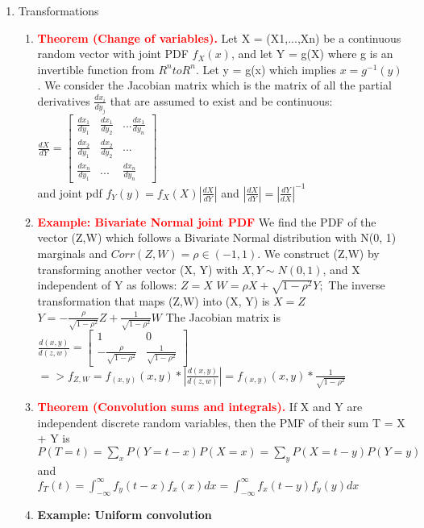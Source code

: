\documentclass[11pt]{article}
\begin{document}
\begin{enumerate}
\begin{enumerate}
\end{enumerate}
\item Transformations
\begin{enumerate}
	\item \textcolor{red}{\textbf{Theorem (Change of variables).}} Let X = (X1,...,Xn) be a continuous random vector with joint PDF $f_X(x)$,
	and let Y = g(X) where g is an invertible function from $R^n to R^n$. Let y = g(x) which implies $x = g^{-1}(y)$. We
	consider the Jacobian matrix which is the matrix of all the partial derivatives $\frac{dx_i}{dy_j}$ that are assumed to exist
	and be continuous:\\
	$\frac{dX}{dY}=\begin{bmatrix}
	\frac{dx_1}{dy_1} & \frac{dx_1}{dy_2} & ... \frac{dx_1}{dy_n}\\
	\frac{dx_2}{dy_1} & \frac{dx_2}{dy_2} & ... \\
	\frac{dx_n}{dy_1} & ... &\frac{dx_n}{dy_n}
	\end{bmatrix}$\\
	and joint pdf $f_Y(y) = f_X(X)|\frac{dX}{dY}|$ and $|\frac{dX}{dY}| = |\frac{dY}{dX}|^{-1}$ 
	\item \textcolor{red}{\textbf{Example: Bivariate Normal joint PDF}}
	We find the PDF of the vector (Z,W) which follows a Bivariate Normal distribution with N(0, 1) marginals
	and $Corr(Z,W) = \rho \in(-1, 1)$. We construct (Z,W) by transforming another vector (X, Y) with $X, Y \sim
	N(0, 1)$, and X independent of Y as follows:
	$Z = X$
	$W = \rho X + \sqrt{1-\rho^2}Y;$
	The inverse transformation that maps (Z,W) into (X, Y) is
	$X = Z$
	$Y = -\frac{\rho}{\sqrt{1-\rho^2}}Z 	+ \frac{1}{\sqrt{1-\rho^2}}W$
	The Jacobian matrix is
	$\frac{d(x,y)}{d(z,w)} = \begin{bmatrix}
		1 & 0 \\
		-\frac{\rho}{\sqrt{1-\rho^2}} & \frac{1}{\sqrt{1-\rho^2}}
	\end{bmatrix}$\\
	$=>f_{Z,W}=f_(x,y)(x,y)* |\frac{d(x,y)}{d(z,w)}| = f_(x,y)(x,y)* \frac{1}{\sqrt{1-\rho^2}} $
	\item \textcolor{red}{\textbf{Theorem (Convolution sums and integrals). }}If X and Y are independent discrete random variables, then
	the PMF of their sum T = X + Y is
	$P(T = t) =\sum_{x}P(Y=t-x)P(X=x) = \sum_{y}P(X=t-y)P(Y=y)$ \\
	and\\
	$f_T(t) = \int_{-\infty}^{\infty}f_y(t-x)f_x(x)dx = \int_{-\infty}^{\infty}f_x(t-y)f_y(y)dx$
	\item \textbf{Example: Uniform convolution}

\end{enumerate}
\end{enumerate}
\end{document}
